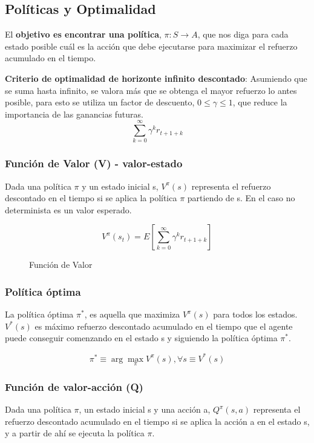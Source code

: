 \documentclass[12pt, twoside, openright]{report} %
\begin{document}
\subsection{Políticas y Optimalidad}

El \textbf{objetivo es encontrar una política}, $\pi: S \rightarrow A$, que nos diga para cada estado posible cuál es la acción que debe ejecutarse para maximizar el refuerzo acumulado en el tiempo.

\textbf{Criterio de optimalidad de horizonte infinito descontado}: Asumiendo que se suma hasta infinito, se valora más que se obtenga el mayor refuerzo lo antes posible, para esto se utiliza un factor de descuento, $0 \leq \gamma \leq 1$, que reduce la importancia de las ganancias futuras.
$$\sum ^\infty _{k=0} \gamma^k r_{t+1+k}$$

\pagebreak

\subsubsection{Función de Valor (V) - valor-estado}
Dada una política $\pi$ y un estado inicial s, $V^\pi (s)$ representa el refuerzo descontado en el tiempo si se aplica la política $\pi$ partiendo de s. En el caso no determinista es un valor esperado.

\begin{figure}[H]
  $$V^\pi(s_t)=E \left[ \sum ^\infty _{k=0} \gamma^k r_{t+1+k} \right]$$
  \captionsetup{justification=centering}
  \caption{Función de Valor}
\end{figure}

\subsubsection{Política óptima}
La política óptima $\pi^*$, es aquella que maximiza $V^\pi (s)$ para todos los estados. $V^* (s)$ es máximo refuerzo descontado acumulado en el tiempo que el agente puede conseguir comenzando en el estado s y siguiendo la política óptima $\pi^*$.

$$\pi ^* \equiv \arg \max_\pi V^\pi (s), \forall s \equiv V^* (s)$$


\subsubsection{Función de valor-acción (Q)}
Dada una política $\pi$, un estado inicial s y una acción a, $Q^\pi (s, a)$ representa el refuerzo descontado acumulado en el tiempo si se aplica la acción a en el estado s, y a partir de ahí se ejecuta la política $\pi$.
\end{document}
